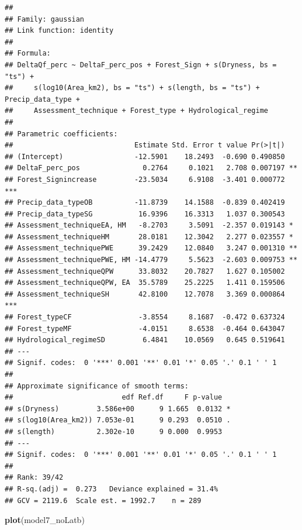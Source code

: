 \documentclass[]{elsarticle} %
\newenvironment{Shaded}{\begin{snugshade}}{\end{snugshade}}
\newcommand{\KeywordTok}[1]{\textcolor[rgb]{0.13,0.29,0.53}{\textbf{#1}}}
\newcommand{\NormalTok}[1]{#1}
\begin{document}
\begin{verbatim}
## 
## Family: gaussian 
## Link function: identity 
## 
## Formula:
## DeltaQf_perc ~ DeltaF_perc_pos + Forest_Sign + s(Dryness, bs = "ts") + 
##     s(log10(Area_km2), bs = "ts") + s(length, bs = "ts") + Precip_data_type + 
##     Assessment_technique + Forest_type + Hydrological_regime
## 
## Parametric coefficients:
##                             Estimate Std. Error t value Pr(>|t|)    
## (Intercept)                 -12.5901    18.2493  -0.690 0.490850    
## DeltaF_perc_pos               0.2764     0.1021   2.708 0.007197 ** 
## Forest_Signincrease         -23.5034     6.9108  -3.401 0.000772 ***
## Precip_data_typeOB          -11.8739    14.1588  -0.839 0.402419    
## Precip_data_typeSG           16.9396    16.3313   1.037 0.300543    
## Assessment_techniqueEA, HM   -8.2703     3.5091  -2.357 0.019143 *  
## Assessment_techniqueHM       28.0181    12.3042   2.277 0.023557 *  
## Assessment_techniquePWE      39.2429    12.0840   3.247 0.001310 ** 
## Assessment_techniquePWE, HM -14.4779     5.5623  -2.603 0.009753 ** 
## Assessment_techniqueQPW      33.8032    20.7827   1.627 0.105002    
## Assessment_techniqueQPW, EA  35.5789    25.2225   1.411 0.159506    
## Assessment_techniqueSH       42.8100    12.7078   3.369 0.000864 ***
## Forest_typeCF                -3.8554     8.1687  -0.472 0.637324    
## Forest_typeMF                -4.0151     8.6538  -0.464 0.643047    
## Hydrological_regimeSD         6.4841    10.0569   0.645 0.519641    
## ---
## Signif. codes:  0 '***' 0.001 '**' 0.01 '*' 0.05 '.' 0.1 ' ' 1
## 
## Approximate significance of smooth terms:
##                          edf Ref.df     F p-value  
## s(Dryness)         3.586e+00      9 1.665  0.0132 *
## s(log10(Area_km2)) 7.053e-01      9 0.293  0.0510 .
## s(length)          2.302e-10      9 0.000  0.9953  
## ---
## Signif. codes:  0 '***' 0.001 '**' 0.01 '*' 0.05 '.' 0.1 ' ' 1
## 
## Rank: 39/42
## R-sq.(adj) =  0.273   Deviance explained = 31.4%
## GCV = 2119.6  Scale est. = 1992.7    n = 289
\end{verbatim}

\begin{Shaded}
\begin{Highlighting}[]
\KeywordTok{plot}\NormalTok{(model7_noLatb)}
\end{Highlighting}
\end{Shaded}
\end{document}
